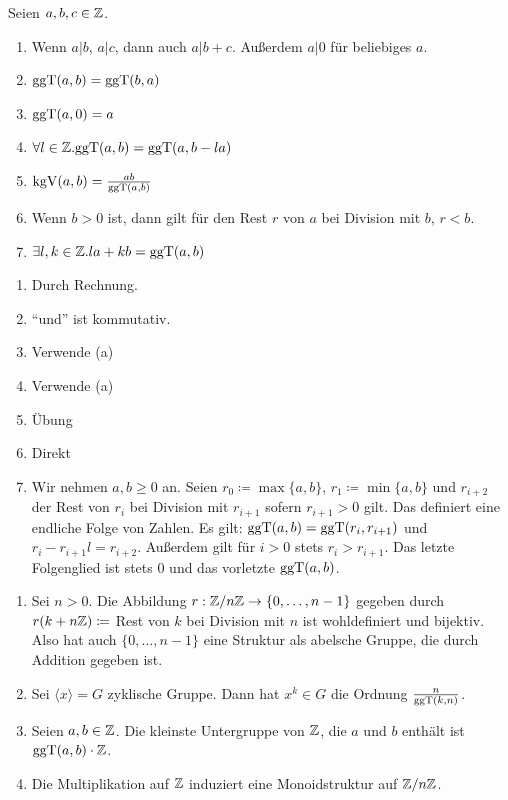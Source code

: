 \begin{bemerkung}
  Seien \(a,b,c\in \mathbb{Z}\).
  \begin{enumerate}
  \item Wenn \(a|b\), \(a|c\), dann auch \(a|b+c\). Außerdem \(a|0\) für beliebiges \(a\).
  \item \(\mathrm{ggT}(a,b)=\mathrm{ggT}(b,a)\)
  \item \(\mathrm{ggT}(a,0)=a\)
  \item \(\forall l\in \mathbb{Z}.\mathrm{ggT}(a,b)=\mathrm{ggT}(a,b-la)\)
  \item \(\mathrm{kgV}(a,b)=\frac{ab}{\mathrm{ggT}(a,b)}\)
  \item Wenn \(b>0\) ist, dann gilt für den Rest \(r\) von \(a\) bei Division mit \(b\), \(r<b\).
  \item \(\exists l,k\in\mathbb{Z}. la+kb=\mathrm{ggT}(a,b)\)
  \end{enumerate}
\end{bemerkung}

\begin{beweis}
  \begin{enumerate}
  \item Durch Rechnung.
  \item ``und'' ist kommutativ.
  \item Verwende (a)
  \item Verwende (a)
  \item Übung
  \item Direkt
  \item Wir nehmen \(a,b\geq 0\) an. Seien \(r_0\coloneq \max\{a,b\}\), \(r_1\coloneq \min\{a,b\}\) und \(r_{i+2}\) der Rest von \(r_{i}\) bei Division mit \(r_{i+1}\) sofern \(r_{i+1}>0\) gilt. Das definiert eine endliche Folge von Zahlen.
    Es gilt: \(\mathrm{ggT}(a,b)=\mathrm{ggT}(r_i,r_{i+1})\) und \(r_i-r_{i+1}l=r_{i+2}\).
    Außerdem gilt für \(i>0\) stets \(r_i>r_{i+1}\).
    Das letzte Folgenglied ist stets 0 und das vorletzte \(\mathrm{ggT}(a,b)\).
  \end{enumerate}
\end{beweis}

\begin{lemma}
  \label{lemma-mit-ggt-ideal-summe}
  \begin{enumerate}
  \item Sei \(n>0\). Die Abbildung \(r:\mathbb{Z}/n\mathbb{Z}\to \{0,\dots,n-1\}\) gegeben durch
    \(r(k+n\mathbb{Z})\coloneq \) Rest von \(k\) bei Division mit \(n\) ist wohldefiniert und bijektiv. Also hat auch \(\{0,\dots,n-1\}\) eine Struktur als abelsche Gruppe, die durch Addition gegeben ist.
  \item Sei \(\langle x\rangle = G\) zyklische Gruppe. Dann hat \(x^k\in G\) die Ordnung \(\frac{n}{\mathrm{ggT}(k,n)}\).
  \item Seien \(a,b\in\mathbb{Z}\). Die kleinste Untergruppe von \(\mathbb{Z}\), die \(a\) und \(b\) enthält ist \(\mathrm{ggT}(a,b)\cdot \mathbb{Z}\).
  \item Die Multiplikation auf \(\mathbb{Z}\) induziert eine Monoidstruktur auf \(\mathbb{Z}/n\mathbb{Z}\).
  \end{enumerate}
\end{lemma}

